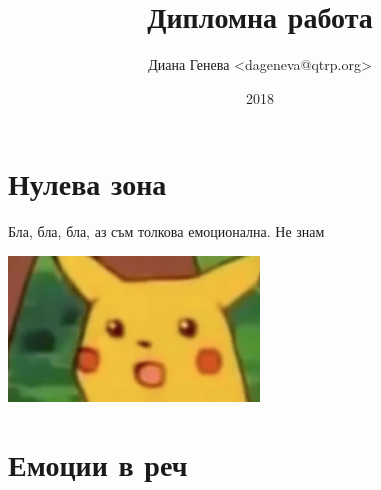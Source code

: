 \documentclass[12pt]{report}
\title{Дипломна работа}
\author{Диана Генева <dageneva@qtrp.org>}
\date{2018}
\numberwithin{equation}{section}
\numberwithin{figure}{section}
\begin{document}
\maketitle
\thispagestyle{empty}
\tableofcontents
\pagebreak

\chapter{Нулева зона}
Бла, бла, бла, аз съм толкова емоционална. 
Не знам

\includegraphics[width=0.5\textwidth ]{pikachu}
\chapter{Емоции в реч}
\label{chap:speech}
\end{document}

